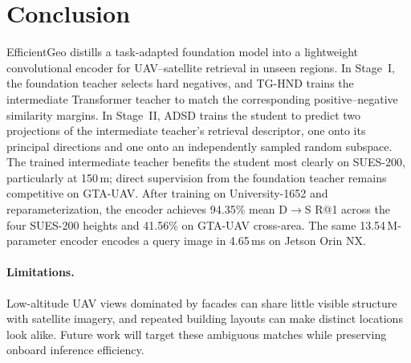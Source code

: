 \section{Conclusion}
\label{sec:conclusion}
EfficientGeo distills a task-adapted foundation model into a lightweight convolutional encoder for UAV--satellite retrieval in unseen regions.
In Stage~I, the foundation teacher selects hard negatives, and TG-HND trains the intermediate Transformer teacher to match the corresponding positive--negative similarity margins.
In Stage~II, ADSD trains the student to predict two projections of the intermediate teacher's retrieval descriptor, one onto its principal directions and one onto an independently sampled random subspace.
The trained intermediate teacher benefits the student most clearly on SUES-200, particularly at 150\,m; direct supervision from the foundation teacher remains competitive on GTA-UAV.
After training on University-1652 and reparameterization, the encoder achieves 94.35\% mean D$\rightarrow$S R@1 across the four SUES-200 heights and 41.56\% on GTA-UAV cross-area.
The same 13.54\,M-parameter encoder encodes a query image in 4.65\,ms on Jetson Orin NX.

\paragraph{Limitations.}
Low-altitude UAV views dominated by facades can share little visible structure with satellite imagery, and repeated building layouts can make distinct locations look alike.
Future work will target these ambiguous matches while preserving onboard inference efficiency.
